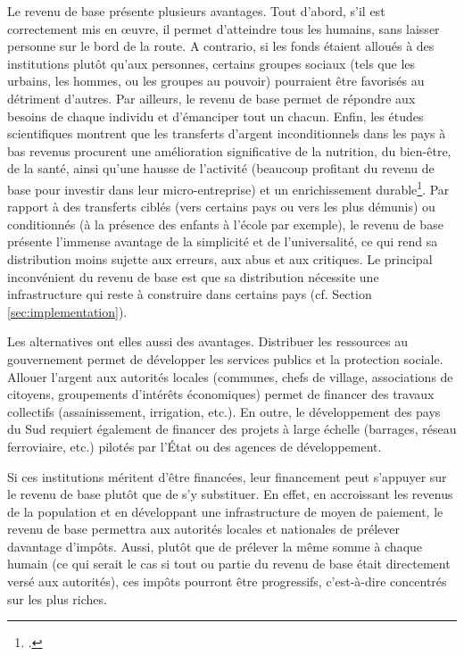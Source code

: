\documentclass[a5paper,french,openany]{memoir}
\begin{document}
Le revenu de base présente plusieurs avantages. Tout d'abord, s'il est correctement mis en œuvre, il permet d'atteindre tous les humains, sans laisser personne sur le bord de la route. A contrario, si les fonds étaient alloués à des institutions plutôt qu'aux personnes, certains groupes sociaux (tels que les urbains, les hommes, ou les groupes au pouvoir) pourraient être favorisés au détriment d'autres. Par ailleurs, le revenu de base permet de répondre aux besoins de chaque individu et d'émanciper tout un chacun. Enfin, les études scientifiques montrent que les transferts d'argent inconditionnels dans les pays à bas revenus procurent une amélioration significative de la nutrition, du bien-être, de la santé, ainsi qu'une hausse de l'activité (beaucoup profitant du revenu de base pour investir dans leur micro-entreprise) et un enrichissement durable\footnote{\cite{haushofer_short-term_2016,egger_general_2022,standing_little_2014}.}. Par rapport à des transferts ciblés (vers certains pays ou vers les plus démunis) ou conditionnés (à la présence des enfants à l'école par exemple), le revenu de base présente l'immense avantage de la simplicité et de l'universalité, ce qui rend sa distribution moins sujette aux erreurs, aux abus et aux critiques. Le principal inconvénient du revenu de base est que sa distribution nécessite une infrastructure qui reste à construire dans certains pays (cf. Section \ref{sec:implementation}).  %

Les alternatives ont elles aussi des avantages. Distribuer les ressources au gouvernement permet de développer les services publics et la protection sociale. Allouer l'argent aux autorités locales (communes, chefs de village, associations de citoyens, groupements d'intérêts économiques) permet de financer des travaux collectifs (assainissement, irrigation, etc.). En outre, le développement des pays du Sud requiert également de financer des projets à large échelle (barrages, réseau ferroviaire, etc.) pilotés par l'État ou des agences de développement. 

Si ces institutions méritent d'être financées, leur financement peut s'appuyer sur 
le revenu de base plutôt que de s'y substituer. En effet, en accroissant les revenus de la population et en développant une infrastructure de moyen de paiement, le revenu de base permettra aux autorités locales et nationales de prélever davantage d'impôts. Aussi, plutôt que de prélever la même somme à chaque humain (ce qui serait le cas si tout ou partie du revenu de base était directement versé aux autorités), ces impôts pourront être progressifs, c'est-à-dire concentrés sur les plus riches. 
\end{document}

